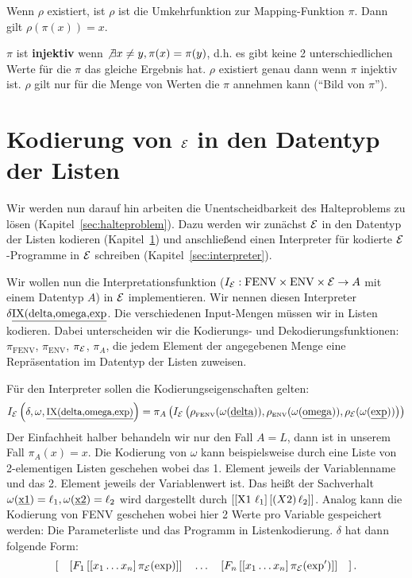 \begin{defn}
Wenn $\rho$ existiert, ist $\rho$ ist die Umkehrfunktion zur Mapping-Funktion $\pi$.
Dann gilt $\rho(\pi(x))=x$.
\end{defn}
$\pi$ ist \textbf{injektiv} wenn $\not \exists x \neq y, \pi(x)=\pi(y)$, d.h.
es gibt keine 2 unterschiedlichen Werte für die $\pi$ das gleiche Ergebnis hat.
$\rho$ existiert genau dann wenn $\pi$ injektiv ist.
$\rho$ gilt nur für die Menge von Werten die $\pi$ annehmen kann (``Bild von $\pi$'').

\section{Kodierung von $\mathcal{E}$ in den Datentyp der Listen}\label{sec:codingE}
Wir werden nun darauf hin arbeiten die Unentscheidbarkeit des Halteproblems zu lösen (Kapitel~\ref{sec:halteproblem}).
Dazu werden wir zunächst $\mathcal{E}$ in den Datentyp der Listen kodieren (Kapitel~\ref{sec:codingE}) und anschließend einen Interpreter für
kodierte $\mathcal{E}$-Programme in $\mathcal{E}$ schreiben (Kapitel~\ref{sec:interpreter}).

Wir wollen nun die Interpretationsfunktion ($I_{\mathcal{E}}: \text{FENV} \times \text{ENV} \times \mathcal{E} \to A$ mit einem Datentyp $A$) in $\mathcal{E}$ implementieren.
Wir nennen diesen Interpreter $\delta\text{\underline{IX(delta,omega,exp}}$.
Die verschiedenen Input-Mengen müssen wir in Listen kodieren. Dabei unterscheiden wir die Kodierungs- und
Dekodierungsfunktionen: $\pi_{\text{FENV}}$, $\pi_{\text{ENV}}$, $\pi_{\mathcal{E}}$, $\pi_{A}$, die jedem Element der angegebenen Menge eine
Repräsentation im Datentyp der Listen zuweisen.

Für den Interpreter sollen die Kodierungseigenschaften gelten:
\[I_{\mathcal{E}}\left(\delta,\omega,\text{\underline{\small IX(delta,omega,exp)}}\right)=\pi_{A}\left(I_{\mathcal{E}}\left(\rho_{\text{\tiny FENV}}(\omega(\text{\underline{delta}})),\rho_{\text{\tiny ENV}}(\omega(\text{\underline{omega}})),\rho_{\mathcal{E}}(\omega(\text{\underline{exp}}))\right)\right)\]
Der Einfachheit halber behandeln wir nur den Fall $A=L$, dann ist in unserem Fall $\pi_{A}(x)=x$.
Die Kodierung von $\omega$ kann beispielsweise durch eine Liste von 2-elementigen Listen geschehen wobei das 1. Element jeweils der Variablenname
und das 2. Element jeweils der Variablenwert ist. Das heißt der Sachverhalt $\omega(\text{\underline{x1}})=\ell_1, \omega(\text{\underline{x2}})=\ell_2$ wird dargestellt durch
$\left[ \left[\text{X1 } \ell_1\right] \left[\left(X2 \right) \ell_2\right] \right]$. Analog kann die Kodierung von FENV geschehen wobei hier 2 Werte pro Variable gespeichert werden: Die Parameterliste und das Programm in Listenkodierung.
$\delta$ hat dann folgende Form: 
\[\left[\quad\left[F_1 \left[ \left[x_1 \ldots x_n\right] \pi_{\mathcal{E}}(\text{exp})\right]\right] \quad \ldots \quad \left[F_n \left[ \left[x_1 \ldots x_n\right] \pi_{\mathcal{E}}(\text{exp}')\right]\right]\quad\right].\]

